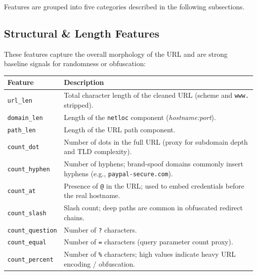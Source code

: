 \documentclass[12pt,a4paper]{article}
\begin{document}


\noindent Features are grouped into five categories described in the following subsections.

\subsection{Structural \& Length Features}

These features capture the overall morphology of the URL and are strong baseline signals for randomness or obfuscation:

\begin{table}[H]
    \centering
    \begin{tabularx}{\textwidth}{l >{\raggedright\arraybackslash}X}
        \toprule
        \textbf{Feature} & \textbf{Description} \\
        \midrule
        \texttt{url\_len}          & Total character length of the cleaned URL (scheme and \texttt{www.} stripped). \\
        \addlinespace[4pt]
        \texttt{domain\_len}       & Length of the \texttt{netloc} component (\textit{hostname:port}). \\
        \addlinespace[4pt]
        \texttt{path\_len}         & Length of the URL path component. \\
        \addlinespace[4pt]
        \texttt{count\_dot}        & Number of dots in the full URL (proxy for subdomain depth and TLD complexity). \\
        \addlinespace[4pt]
        \texttt{count\_hyphen}     & Number of hyphens; brand-spoof domains commonly insert hyphens (e.g., \texttt{paypal-secure.com}). \\
        \addlinespace[4pt]
        \texttt{count\_at}         & Presence of \texttt{@} in the URL; used to embed credentials before the real hostname. \\
        \addlinespace[4pt]
        \texttt{count\_slash}      & Slash count; deep paths are common in obfuscated redirect chains. \\
        \addlinespace[4pt]
        \texttt{count\_question}   & Number of \texttt{?} characters. \\
        \addlinespace[4pt]
        \texttt{count\_equal}      & Number of \texttt{=} characters (query parameter count proxy). \\
        \addlinespace[4pt]
        \texttt{count\_percent}    & Number of \texttt{\%} characters; high values indicate heavy URL encoding / obfuscation. \\

\end{tabularx}
\end{table}
\end{document}
